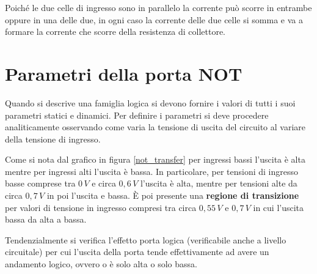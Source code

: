 \documentclass[12pt, a4paper]{report}
\begin{document}
Poiché le due celle di ingresso sono in parallelo la corrente può scorre in entrambe oppure in una delle due, in ogni caso la corrente delle due celle si somma e va a formare la corrente che scorre della resistenza di collettore.

\section{Parametri della porta NOT}
Quando si descrive una famiglia logica si devono fornire i valori di tutti i suoi parametri statici e dinamici. Per definire i parametri si deve procedere analiticamente osservando come varia la tensione di uscita del circuito al variare della tensione di ingresso.

Come si nota dal grafico in figura \ref{not_transfer} per ingressi bassi l'uscita è alta mentre per ingressi alti l'uscita è bassa. In particolare, per tensioni di ingresso basse comprese tra $0\,V$ e circa $0,6\,V$ l'uscita è alta, mentre per tensioni alte da circa $0,7\,V$ in poi l'uscita e bassa. È poi presente una \textbf{regione di transizione} per valori di tensione in ingresso compresi tra circa $0,55\,V$ e $0,7\,V$ in cui l'uscita bassa da alta a bassa.

Tendenzialmente si verifica l'effetto porta logica (verificabile anche a livello circuitale) per cui l'uscita della porta tende effettivamente ad avere un andamento logico, ovvero o è solo alta o solo bassa.
\end{document}
